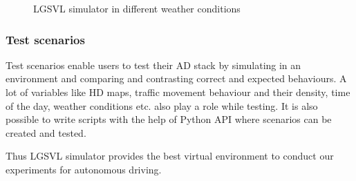 \begin{figure}[!ht]
    \centering
    \def\svgwidth{\textwidth}
    
    \caption{LGSVL simulator in different weather conditions}
    \label{fig:weatherconditions}
\end{figure}

\subsubsection*{Test scenarios}
Test scenarios enable users to test their AD stack by simulating in an environment and
comparing and contrasting correct and expected behaviours. A lot of variables like HD maps,
traffic movement behaviour and their density, time of the day, weather conditions etc. also
play a role while testing. It is also possible to write scripts with the help of Python
API where scenarios can be created and tested.

Thus LGSVL simulator \cite{rong2020lgsvl} provides the best virtual environment to conduct our experiments for
autonomous driving.
